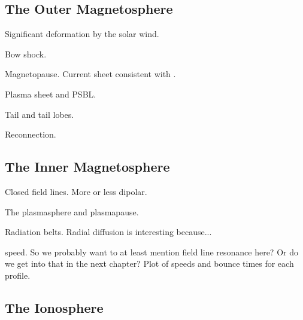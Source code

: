 
\subsection{The Outer Magnetosphere}


Significant deformation by the solar wind. 

Bow shock. 

Magnetopause. Current sheet consistent with \amplaw. 

Plasma sheet and PSBL. 

Tail and tail lobes. 

Reconnection. 


\subsection{The Inner Magnetosphere}

Closed field lines. More or less dipolar. 

The plasmasphere and plasmapause. 

Radiation belts. Radial diffusion is interesting because... 

\Alfven speed. So we probably want to at least mention field line resonance here? Or do we get into that in the next chapter? Plot of \Alfven speeds and \Alfven bounce times for each profile. 


\subsection{The Ionosphere}
  \label{sec_ionos}


